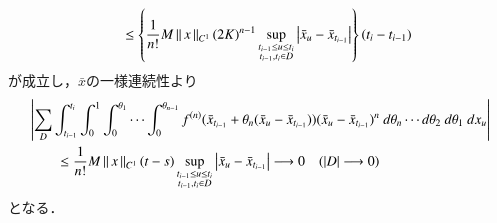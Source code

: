 \begin{prf}
\begin{align}
			&\qquad \leq \left\{ \frac{1}{n!} M \left\|\, x\, \right\|_{C^1} (2K)^{n-1} \operatorname*{sup}_{\substack{t_{i-1} \leq u \leq t_i \\ t_{i-1},t_i \in D}} \left| \bar{x}_u - \bar{x}_{t_{i-1}} \right| \right\} (t_i - t_{i-1})
		\end{align}
		が成立し，$\bar{x}$の一様連続性より
		\begin{align}
			&\left| \sum_D \int_{t_{i-1}}^{t_i} \int_0^1 \int_0^{\theta_1} \cdots \int_0^{\theta_{n-1}} f^{(n)}(\bar{x}_{t_{i-1}} + \theta_n(\bar{x}_u - \bar{x}_{t_{i-1}}))(\bar{x}_u - \bar{x}_{t_{i-1}})^n\ d\theta_n\cdots d\theta_2\ d\theta_1\ dx_u \right| \\
			&\qquad \leq \frac{1}{n!} M \left\|\, x\, \right\|_{C^1} (t-s) \operatorname*{sup}_{\substack{t_{i-1} \leq u \leq t_i \\ t_{i-1},t_i \in D}} \left| \bar{x}_u - \bar{x}_{t_{i-1}} \right|
			\longrightarrow 0
			\quad (|D| \longrightarrow 0)
		\end{align}
		となる．
		\QED
	\end{prf}
	
